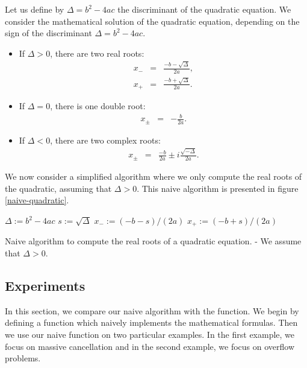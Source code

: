 Let us define by $\Delta=b^2-4ac$ the discriminant of the quadratic equation.
We consider the mathematical solution of the quadratic equation, 
depending on the sign of the discriminant $\Delta=b^2 - 4ac$.
\begin{itemize}
\item If $\Delta> 0$, there are two real roots: 
\begin{eqnarray}
x_- &=& \frac{-b- \sqrt{\Delta}}{2a}, \label{real:x-} \\
x_+ &=& \frac{-b+ \sqrt{\Delta}}{2a}. \label{real:x+}
\end{eqnarray}
\item If $\Delta=0$, there is one double root:
\begin{eqnarray}
\label{realdouble:x-+}
x_\pm &=& -\frac{b}{2a}.
\end{eqnarray}
\item If $\Delta< 0$, there are two complex roots:
\begin{eqnarray}
\label{complex:x-+}
x_\pm &=&\frac{-b}{2a} \pm i \frac{\sqrt{-\Delta}}{2a}.
\end{eqnarray}
\end{itemize}

We now consider a simplified algorithm where we only compute the real roots of the 
quadratic, assuming that $\Delta>0$.
This naive algorithm is presented in figure \ref{naive-quadratic}.

\begin{algorithm}[htbp]
$\Delta:= b^2-4ac$\;
$s:= \sqrt{\Delta}$\;
$x_-:= (-b-s)/(2a)$\;
$x_+:= (-b+s)/(2a)$\;
\caption{Naive algorithm to compute the real roots of a quadratic equation. - We assume that $\Delta> 0$.}
\label{naive-quadratic}
\end{algorithm}

\subsection{Experiments}

In this section, we compare our naive algorithm with the  function.
We begin by defining a function which naively implements the mathematical formulas.
Then we use our naive function on two particular examples. 
In the first example, we focus on massive cancellation and in the second example, we 
focus on overflow problems.

